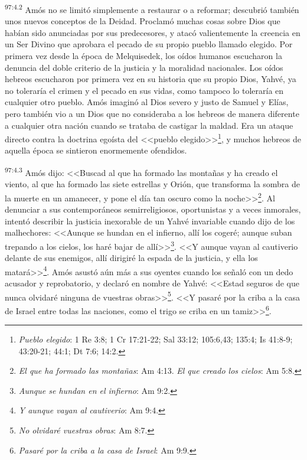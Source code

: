 \par
\textsuperscript{97:4.2} Amós no se limitó simplemente a restaurar o a reformar; descubrió también unos nuevos conceptos de la Deidad. Proclamó muchas cosas sobre Dios que habían sido anunciadas por sus predecesores, y atacó valientemente la creencia en un Ser Divino que aprobara el pecado de su propio pueblo llamado elegido. Por primera vez desde la época de Melquisedek, los oídos humanos escucharon la denuncia del doble criterio de la justicia y la moralidad nacionales. Los oídos hebreos escucharon por primera vez en su historia que su propio Dios, Yahvé, ya no toleraría el crimen y el pecado en sus vidas, como tampoco lo toleraría en cualquier otro pueblo. Amós imaginó al Dios severo y justo de Samuel y Elías, pero también vio a un Dios que no consideraba a los hebreos de manera diferente a cualquier otra nación cuando se trataba de castigar la maldad. Era un ataque directo contra la doctrina egoísta del <<pueblo elegido>>\footnote{\textit{Pueblo elegido}: 1 Re 3:8; 1 Cr 17:21-22; Sal 33:12; 105:6,43; 135:4; Is 41:8-9; 43:20-21; 44:1; Dt 7:6; 14:2.}, y muchos hebreos de aquella época se sintieron enormemente ofendidos.

\par
\textsuperscript{97:4.3} Amós dijo: <<Buscad al que ha formado las montañas y ha creado el viento, al que ha formado las siete estrellas y Orión, que transforma la sombra de la muerte en un amanecer, y pone el día tan oscuro como la noche>>\footnote{\textit{El que ha formado las montañas}: Am 4:13. \textit{El que creado los cielos}: Am 5:8.}. Al denunciar a sus contemporáneos semirreligiosos, oportunistas y a veces inmorales, intentó describir la justicia inexorable de un Yahvé invariable cuando dijo de los malhechores: <<Aunque se hundan en el infierno, allí los cogeré; aunque suban trepando a los cielos, los haré bajar de allí>>\footnote{\textit{Aunque se hundan en el infierno}: Am 9:2.}. <<Y aunque vayan al cautiverio delante de sus enemigos, allí dirigiré la espada de la justicia, y ella los matará>>\footnote{\textit{Y aunque vayan al cautiverio}: Am 9:4.}. Amós asustó aún más a sus oyentes cuando los señaló con un dedo acusador y reprobatorio, y declaró en nombre de Yahvé: <<Estad seguros de que nunca olvidaré ninguna de vuestras obras>>\footnote{\textit{No olvidaré vuestras obras}: Am 8:7.}. <<Y pasaré por la criba a la casa de Israel entre todas las naciones, como el trigo se criba en un tamiz>>\footnote{\textit{Pasaré por la criba a la casa de Israel}: Am 9:9.}.

